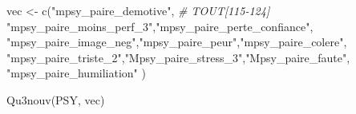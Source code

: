 \documentclass[
]{article}
\newenvironment{Shaded}{\begin{snugshade}}{\end{snugshade}}
\newcommand{\CommentTok}[1]{\textcolor[rgb]{0.56,0.35,0.01}{\textit{#1}}}
\newcommand{\FunctionTok}[1]{\textcolor[rgb]{0.00,0.00,0.00}{#1}}
\newcommand{\NormalTok}[1]{#1}
\newcommand{\OtherTok}[1]{\textcolor[rgb]{0.56,0.35,0.01}{#1}}
\newcommand{\StringTok}[1]{\textcolor[rgb]{0.31,0.60,0.02}{#1}}
\begin{document}
\begin{Shaded}
\begin{Highlighting}[]
\NormalTok{vec }\OtherTok{\textless{}{-}} \FunctionTok{c}\NormalTok{(}\StringTok{"mpsy\_paire\_demotive"}\NormalTok{,     }\CommentTok{\# TOUT[115{-}124]}
         \StringTok{"mpsy\_paire\_moins\_perf\_3"}\NormalTok{,}\StringTok{"mpsy\_paire\_perte\_confiance"}\NormalTok{,  }
    \StringTok{"mpsy\_paire\_image\_neg"}\NormalTok{,}\StringTok{"mpsy\_paire\_peur"}\NormalTok{,}\StringTok{"mpsy\_paire\_colere"}\NormalTok{,}
    \StringTok{"mpsy\_paire\_triste\_2"}\NormalTok{,}\StringTok{"Mpsy\_paire\_stress\_3"}\NormalTok{,}\StringTok{"Mpsy\_paire\_faute"}\NormalTok{,}
    \StringTok{"mpsy\_paire\_humiliation"}
\NormalTok{     )}

\FunctionTok{Qu3nouv}\NormalTok{(PSY, vec)}
\end{Highlighting}
\end{Shaded}
\end{document}
